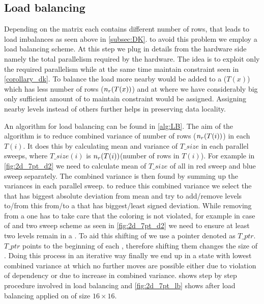   \subsection{Load balancing}\label{subsec:LB}
  Depending on the matrix each \levelGroup contains different number of rows, that leads to load imbalances as {\CA seen above} in \cref{subsec:DK}. \Inorder to avoid this problem we employ a load balancing scheme. At this step  we plug in details from the hardware side  namely the total parallelism required by the hardware. The idea is to exploit only the required parallelism while at the same time maintain \DK constraint seen in \cref{corollary_dk}. To balance the load more nearby \levels would be added to a \levelGroup ($T(x)$) which has less number of rows ($n_{r}(T(x))$) and at \levelGroup where we have considerably big \levels only sufficient amount of \levels to maintain \DK constraint would be assigned. Assigning nearby levels instead of others further helps in preserving data locality. 
  
  An algorithm for load balancing can be found in \cref{alg:LB}. The aim of the algorithm is to reduce combined variance of number of rows ($n_{r}(T(i))$) in each \levelGroup $T(i)$. It does this by calculating mean and variance of $T\_size$ in each parallel sweeps, where $T\_size(i)$ is $n_{r}(T(i))$(number of rows in $T(i)$). For example in \cref{fig:2d_7pt_d2} we need to calculate mean of $T\_size$ of all \levelGroups in red sweep and blue sweep separately. The combined variance is then found by summing up the variances in each parallel sweep. \Inorder to reduce this combined variance we select the \levelGroup that has biggest absolute deviation from mean and try to add/remove levels to/from this \levelGroup from/to a \levelGroup that has biggest/least signed deviation. While removing \levels from a \levelGroup one has to take care that the \DK coloring is not violated, for example in case of \DTWO and two sweep scheme as seen in \cref{fig:2d_7pt_d2} we need to ensure at least two levels remain in a \levelGroup. To aid this shifting of \levels we use a pointer denoted as $T\_ptr$. $T\_ptr$ points to the beginning of each \levelGroup, therefore shifting them changes the size of \levelGroups. Doing this process in an iterative way finally we end up in a state with lowest combined variance at which no further moves are possible either due to violation of \DK dependency or due to increase in combined variance.  shows step by step procedure involved in load balancing and \cref{fig:2d_7pt_lb} shows \levelGroups after load balancing applied on \stex of size $16 \times 16.$

